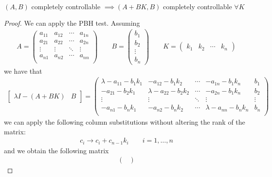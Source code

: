 \documentclass[english]{lectures}
\begin{document}
\begin{theorem}
    $(A,B)$ completely controllable $\implies (A+BK,B)$ completely controllable $\forall K$
\end{theorem}
\begin{proof}
    We can apply the PBH test. Assuming
    \begin{gather*}
        A=\begin{pmatrix}
            a_{11} & a_{12}& \cdots & a_{1n}\\
            a_{21} & a_{22}& \cdots & a_{2n}\\
            \vdots & \vdots& \ddots & \vdots\\
            a_{n1} & a_{n2}& \cdots & a_{nn}\\
        \end{pmatrix}\qquad B=\begin{pmatrix}
            b_1 \\ b_2 \\ \vdots \\ b_n
        \end{pmatrix} \qquad K=\begin{pmatrix}
            k_1 & k_2 & \cdots & k_n
        \end{pmatrix}
    \end{gather*}
    we have that
    \begin{gather*}
        \begin{bmatrix}
            \lambda I -(A+BK) & B
        \end{bmatrix}=\begin{pmatrix}
            \lambda-a_{11}-b_1k_1 & -a_{12}-b_1k_2& \cdots & -a_{1n}-b_1k_n & b_1\\
            -a_{21}-b_2k_1 & \lambda-a_{22}-b_2k_2& \cdots & -a_{2n}-b_1k_n & b_2\\
            \vdots & \vdots & \ddots & \vdots & \vdots\\
            -a_{n1}-b_nk_1 & -a_{n2}-b_nk_2& \cdots & \lambda-a_{nn}-b_nk_n & b_n\\
        \end{pmatrix}
    \end{gather*}
    we can apply the following column substitutions without altering the rank of the matrix:
    \begin{gather*}
        c_i\rightarrow c_i+c_{n-1}k_i \qquad i=1,\dots,n
    \end{gather*}
    and we obtain the following matrix
    \begin{gather*}
        \begin{pmatrix}

\end{pmatrix}
\end{gather*}
\end{proof}
\end{document}
